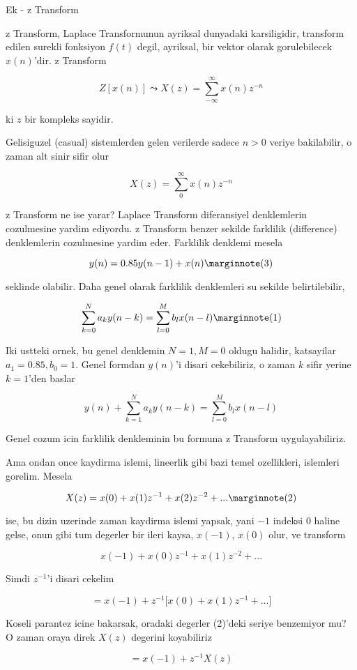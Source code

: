 \documentclass[12pt,fleqn]{article}\usepackage{../common}
\begin{document}
Ek - z Transform 

z Transform, Laplace Transformunun ayriksal dunyadaki karsiligidir,
transform edilen surekli fonksiyon $f(t)$ degil, ayriksal, bir vektor
olarak gorulebilecek $x(n)$'dir. z Transform

$$ Z[x(n)] \leadsto X(z) = \sum_{-\infty}^{\infty} x(n)z^{-n}  $$

ki $z$ bir kompleks sayidir. 

Gelisiguzel (casual) sistemlerden gelen verilerde sadece $n>0$ veriye
bakilabilir, o zaman alt sinir sifir olur

$$ X(z) = \sum_{0}^{\infty} x(n)z^{-n}  $$

z Transform ne ise yarar? Laplace Transform diferansiyel denklemlerin
cozulmesine yardim ediyordu. z Transform benzer sekilde farklilik
(difference) denklemlerin cozulmesine yardim eder. Farklilik denklemi
mesela

$$ y(n) = 0.85 y(n-1) + x(n) 
\mlabel{3}
$$

seklinde olabilir. Daha genel olarak farklilik denklemleri su sekilde
belirtilebilir,

$$ \sum_{k=0}^N a_k y(n-k) = \sum_{l=0}^M b_l x(n-l) 
\mlabel{1}
$$

Iki ustteki ornek, bu genel denklemin $N=1,M=0$ oldugu halidir, katsayilar
$a_1 = 0.85,b_0=1$. Genel formdan $y(n)$'i disari cekebiliriz, o zaman
$k$ sifir yerine $k=1$'den baslar

$$ y(n) + \sum_{k=1}^N a_k y(n-k) = \sum_{l=0}^M b_l x(n-l) $$

Genel cozum icin farklilik denkleminin bu formuna z Transform
uygulayabiliriz. 

Ama ondan once kaydirma islemi, lineerlik gibi bazi temel ozellikleri,
islemleri gorelim. Mesela

$$ X(z) = x(0) + x(1)z^{-1} + x(2) z^{-2} + ... 
\mlabel{2}
$$

ise, bu dizin uzerinde zaman kaydirma islemi yapsak, yani $-1$ indeksi
$0$ haline gelse, onun gibi tum degerler bir ileri kaysa, $x(-1)$,
$x(0)$ olur, ve transform

$$ x(-1) + x(0)z^{-1} + x(1) z^{-2} + ...$$

Simdi $z^{-1}$'i disari cekelim

$$ = x(-1) + z^{-1} \bigg[ x(0) + x(1) z^{-1} + ... \bigg] $$

Koseli parantez icine bakarsak, oradaki degerler (2)'deki seriye benzemiyor
mu? O zaman oraya direk $X(z)$ degerini koyabiliriz

$$ = x(-1) + z^{-1}X(z)$$
\end{document}
